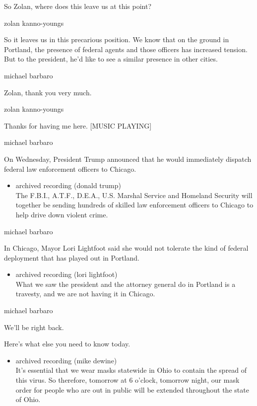 So Zolan, where does this leave us at this point?

zolan kanno-youngs

So it leaves us in this precarious position. We know that on the ground
in Portland, the presence of federal agents and those officers has
increased tension. But to the president, he'd like to see a similar
presence in other cities.

michael barbaro

Zolan, thank you very much.

zolan kanno-youngs

Thanks for having me here. {[}MUSIC PLAYING{]}

michael barbaro

On Wednesday, President Trump announced that he would immediately
dispatch federal law enforcement officers to Chicago.

\begin{itemize}
\tightlist
\item
  archived recording (donald trump)\\
  The F.B.I., A.T.F., D.E.A., U.S. Marshal Service and Homeland Security
  will together be sending hundreds of skilled law enforcement officers
  to Chicago to help drive down violent crime.
\end{itemize}

michael barbaro

In Chicago, Mayor Lori Lightfoot said she would not tolerate the kind of
federal deployment that has played out in Portland.

\begin{itemize}
\tightlist
\item
  archived recording (lori lightfoot)\\
  What we saw the president and the attorney general do in Portland is a
  travesty, and we are not having it in Chicago.
\end{itemize}

michael barbaro

We'll be right back.

Here's what else you need to know today.

\begin{itemize}
\tightlist
\item
  archived recording (mike dewine)\\
  It's essential that we wear masks statewide in Ohio to contain the
  spread of this virus. So therefore, tomorrow at 6 o'clock, tomorrow
  night, our mask order for people who are out in public will be
  extended throughout the state of Ohio.
\end{itemize}

